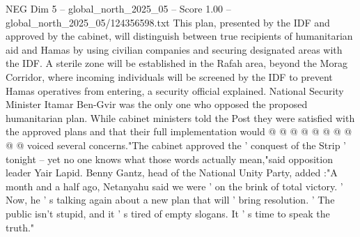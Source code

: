 \begin{textsample}{NEG Dim 5 – global\_north\_2025\_05 – Score 1.00 – global\_north\_2025\_05/124356598.txt}
This plan, presented by the IDF and approved by the cabinet, will distinguish between true recipients of humanitarian aid and Hamas by using civilian companies and securing designated areas with the IDF.
A sterile zone will be established in the Rafah area, beyond the Morag Corridor, where incoming individuals will be screened by the IDF to prevent Hamas operatives from entering, a security official explained.
National Security Minister Itamar Ben-Gvir was the only one who opposed the proposed humanitarian plan.
While cabinet ministers told the Post they were satisfied with the approved plans and that their full implementation would @ @ @ @ @ @ @ @ @ @ voiced several concerns."The cabinet approved the ' conquest of the Strip ' tonight -- yet no one knows what those words actually mean,"said opposition leader Yair Lapid.
Benny Gantz, head of the National Unity Party, added :"A month and a half ago, Netanyahu said we were ' on the brink of total victory. ' Now, he ' s talking again about a new plan that will ' bring resolution. ' The public isn't stupid, and it ' s tired of empty slogans.
It ' s time to speak the truth."

\end{textsample}
